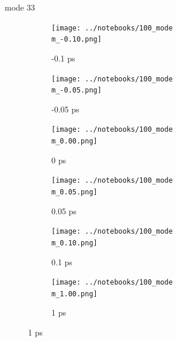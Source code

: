 \documentclass{beamer}
\begin{document}
\renewcommand\m{33}
\begin{frame}{mode \m}
	\begin{figure}
		\centering
		\begin{subfigure}[b]{\w\textwidth}
			\centering
			\texttt{[image: ../notebooks/100\_mode\\m\_-0.10.png]}
			\caption{-0.1 ps}
		\end{subfigure}
		\begin{subfigure}[b]{\w\textwidth}
			\centering
			\texttt{[image: ../notebooks/100\_mode\\m\_-0.05.png]}
			\caption{-0.05 ps}
		\end{subfigure}
		\begin{subfigure}[b]{\w\textwidth}
			\centering
			\texttt{[image: ../notebooks/100\_mode\\m\_0.00.png]}
			\caption{0 ps}
		\end{subfigure}
		\begin{subfigure}[b]{\w\textwidth}
			\centering
			\texttt{[image: ../notebooks/100\_mode\\m\_0.05.png]}
			\caption{0.05 ps}
		\end{subfigure}
		\begin{subfigure}[b]{\w\textwidth}
			\centering
			\texttt{[image: ../notebooks/100\_mode\\m\_0.10.png]}
			\caption{0.1 ps}
		\end{subfigure}
		\begin{subfigure}[b]{\w\textwidth}
			\centering
			\texttt{[image: ../notebooks/100\_mode\\m\_1.00.png]}
			\caption{1 ps}
		\end{subfigure}
	\end{figure}
\end{frame}
\end{document}
